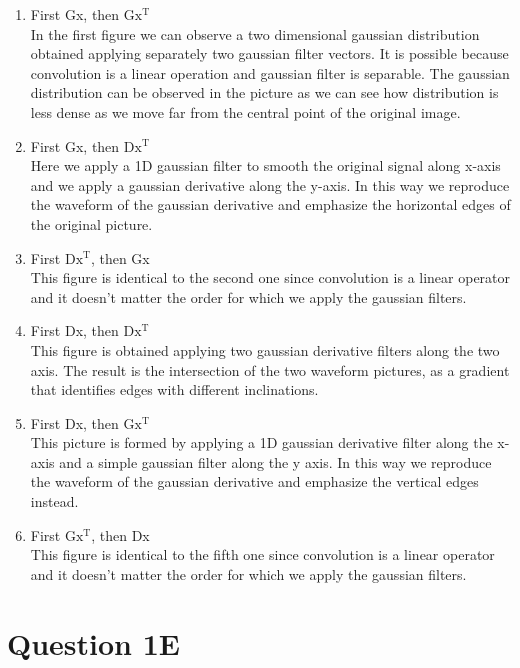\documentclass[
	12pt, %
]{fphw}
\begin{document}
\begin{enumerate} 
 \item First Gx, then $\mathrm{Gx^{T}}$
	\\In the first figure we can observe a two dimensional gaussian distribution obtained applying separately two gaussian filter vectors. It is possible because convolution is a linear operation and gaussian filter is separable. The gaussian distribution can be observed in the picture as we can see how distribution is less dense as we move far from the central point of the original image.

 \item First Gx, then $\mathrm{Dx^{T}}$
	\\Here we apply a 1D gaussian filter to smooth the original signal along x-axis and we apply a gaussian derivative along the y-axis. In this way we reproduce the waveform of the gaussian derivative and emphasize the horizontal edges of the original picture. 

 \item First $\mathrm{Dx^{T}}$, then Gx
	\\This figure is identical to the second one since convolution is a linear operator and it doesn’t matter the order for which we apply the gaussian filters. 

 \item First Dx, then $\mathrm{Dx^{T}}$
	\\ This figure is obtained applying two gaussian derivative filters along the two axis. The result is the intersection of the two waveform pictures, as a gradient that identifies edges with different inclinations.

 \item First Dx, then $\mathrm{Gx^{T}}$
	\\ This  picture is formed by applying a 1D gaussian derivative filter along the x-axis and a simple gaussian filter along the y axis.  In this way we reproduce the waveform of the gaussian derivative and emphasize the vertical edges instead.

 \item First $\mathrm{Gx^{T}}$, then Dx
	\\This figure is identical to the fifth one since convolution is a linear operator and it doesn’t matter the order for which we apply the gaussian filters. 
 \end{enumerate}


\section { Question 1E}
\end{document}
